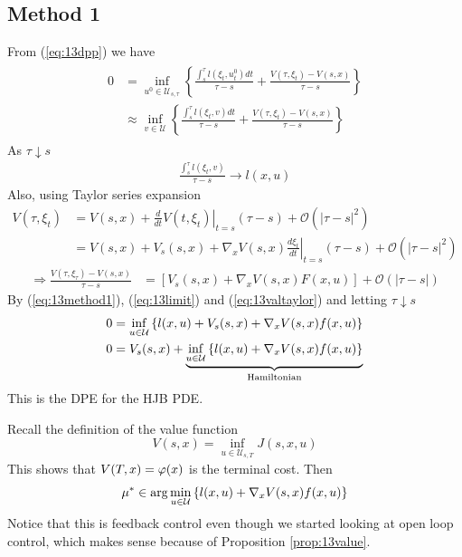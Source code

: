 \subsection{Method 1}
From (\ref{eq:13dpp}) we have
\begin{align}
\label{eq:13method1}
\begin{split}
0 &= \inf_{u^0\in\mathcal{U}_{s,\tau}} \left\lbrace \frac{\int_s^\tau l(\xi_t,u_t^0)dt}{\tau-s} + \frac{V(\tau,\xi_t)-V(s,x)}{\tau-s} \right\rbrace \\
&\approx\inf_{v\in\mathcal{U}} \left\lbrace \frac{\int_s^\tau l(\xi_t,v)dt}{\tau-s} + \frac{V(\tau,\xi_t)-V(s,x)}{\tau-s} \right\rbrace
\end{split}
\end{align}
As $\tau\downarrow s$
\begin{align}
\label{eq:13limit}
\frac{\int_s^\tau l(\xi_t,v)}{\tau-s} \to l(x,u)
\end{align}
Also, using Taylor series expansion
\begin{align*}
V(\tau,\xi_t) &= V(s,x) + \left.\frac{d}{dt}V(t,\xi_t)\right|_{t=s}(\tau-s) + \mathcal{O}(|\tau-s|^2) \\
&= V(s,x) + V_s(s,x) + \nabla_x V(s,x) \left.\frac{d\xi_t}{dt}\right|_{t=s}(\tau-s) + \mathcal{O}(|\tau-s|^2)
\end{align*}
\begin{align}
\label{eq:13valtaylor}
\Rightarrow \frac{V(\tau,\xi_\tau)-V(s,x)}{\tau-s} &= \left[V_s(s,x) + \nabla_x V(s,x)F(x,u)\right] + \mathcal{O}(|\tau-s|)
\end{align}
By (\ref{eq:13method1}), (\ref{eq:13limit}) and (\ref{eq:13valtaylor}) and letting $\tau\downarrow s$
\begin{align*}
0 &= \inf_{u\in\mathcal{U}} \left\lbrace l(x,u) + V_s(s,x) + \nabla_x V(s,x)f(x,u) \right\rbrace \\
0 &= V_s(s,x) + \underbrace{\inf_{u\in\mathcal{U}} \left\lbrace l(x,u) + \nabla_x V(s,x)f(x,u) \right\rbrace}_{\text{Hamiltonian}}
\end{align*}
This is the DPE for the HJB PDE.

Recall the definition of the value function
$$V(s,x) = \inf_{u\in\mathcal{U}_{s,T}} J(s,x,u)$$
This shows that $V(T,x) = \varphi(x)$ is the terminal cost. Then
$$\mu^\ast \in \arg\min_{u\in\mathcal{U}} \left\lbrace l(x,u) + \nabla_x V(s,x) f(x,u) \right\rbrace$$
Notice that this is feedback control even though we started looking at open loop control, which makes sense because of Proposition \ref{prop:13value}.

